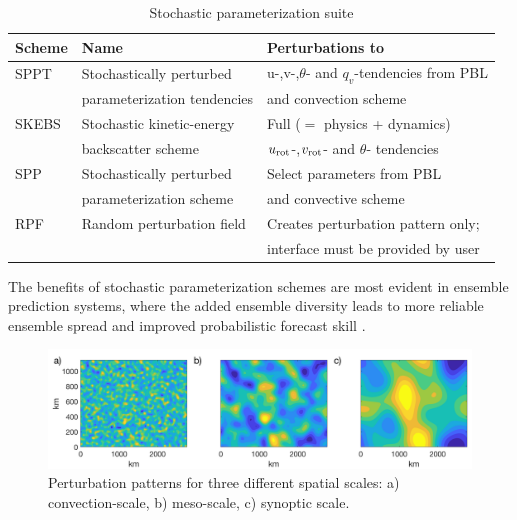 \begin{table}
\begin{center}
\caption{Stochastic parameterization suite}
\label{stoch_table}
\begin{tabular}{ | l | l | l |}
\hline
Scheme          & Name & Perturbations to \\ 
\hline
SPPT  & Stochastically perturbed    &  u-,v-,$\theta$- and $q_v$-tendencies from PBL\\
      & parameterization tendencies &  and convection scheme\\  \hline

SKEBS & Stochastic kinetic-energy   &  Full ($=$ physics + dynamics) \\
      & backscatter scheme          &  $u_{\rm rot}$-,$v_{\rm rot}$- and $\theta$- tendencies\\  \hline

SPP & Stochastically perturbed      &  Select parameters from PBL \\
    & parameterization scheme       &  and convective scheme\\  \hline

RPF & Random perturbation field     &  Creates perturbation pattern only;  \\
    &                               &  interface must be provided by user\\
\hline
\end{tabular}
\end{center}
\end{table}

The benefits of stochastic parameterization schemes are most evident in ensemble 
prediction systems, where the added ensemble diversity leads to more reliable 
ensemble spread and improved probabilistic forecast skill \citep[e.g.][]{Be15}.

\begin{figure}[h!]
  \includegraphics[width=6.5in]{figures/stoch_pattern.png}
    \caption{Perturbation patterns for three different spatial scales: 
     a) convection-scale, b) meso-scale, c) synoptic scale.}
  \label{figure:stoch_pattern}
\end{figure}


